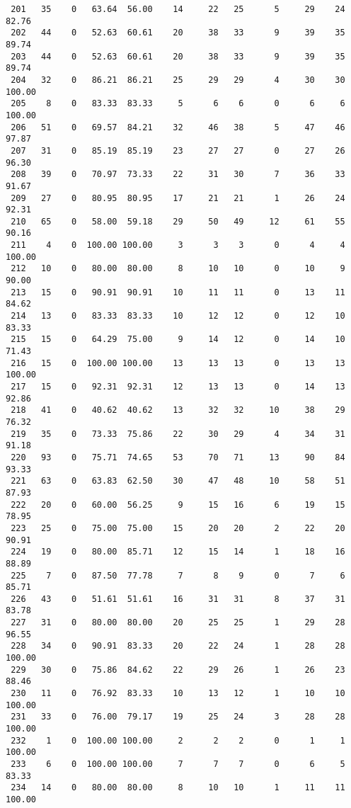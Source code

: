 \begin{verbatim}
 201   35    0   63.64  56.00    14     22   25      5     29    24    82.76
 202   44    0   52.63  60.61    20     38   33      9     39    35    89.74
 203   44    0   52.63  60.61    20     38   33      9     39    35    89.74
 204   32    0   86.21  86.21    25     29   29      4     30    30   100.00
 205    8    0   83.33  83.33     5      6    6      0      6     6   100.00
 206   51    0   69.57  84.21    32     46   38      5     47    46    97.87
 207   31    0   85.19  85.19    23     27   27      0     27    26    96.30
 208   39    0   70.97  73.33    22     31   30      7     36    33    91.67
 209   27    0   80.95  80.95    17     21   21      1     26    24    92.31
 210   65    0   58.00  59.18    29     50   49     12     61    55    90.16
 211    4    0  100.00 100.00     3      3    3      0      4     4   100.00
 212   10    0   80.00  80.00     8     10   10      0     10     9    90.00
 213   15    0   90.91  90.91    10     11   11      0     13    11    84.62
 214   13    0   83.33  83.33    10     12   12      0     12    10    83.33
 215   15    0   64.29  75.00     9     14   12      0     14    10    71.43
 216   15    0  100.00 100.00    13     13   13      0     13    13   100.00
 217   15    0   92.31  92.31    12     13   13      0     14    13    92.86
 218   41    0   40.62  40.62    13     32   32     10     38    29    76.32
 219   35    0   73.33  75.86    22     30   29      4     34    31    91.18
 220   93    0   75.71  74.65    53     70   71     13     90    84    93.33
 221   63    0   63.83  62.50    30     47   48     10     58    51    87.93
 222   20    0   60.00  56.25     9     15   16      6     19    15    78.95
 223   25    0   75.00  75.00    15     20   20      2     22    20    90.91
 224   19    0   80.00  85.71    12     15   14      1     18    16    88.89
 225    7    0   87.50  77.78     7      8    9      0      7     6    85.71
 226   43    0   51.61  51.61    16     31   31      8     37    31    83.78
 227   31    0   80.00  80.00    20     25   25      1     29    28    96.55
 228   34    0   90.91  83.33    20     22   24      1     28    28   100.00
 229   30    0   75.86  84.62    22     29   26      1     26    23    88.46
 230   11    0   76.92  83.33    10     13   12      1     10    10   100.00
 231   33    0   76.00  79.17    19     25   24      3     28    28   100.00
 232    1    0  100.00 100.00     2      2    2      0      1     1   100.00
 233    6    0  100.00 100.00     7      7    7      0      6     5    83.33
 234   14    0   80.00  80.00     8     10   10      1     11    11   100.00

\end{verbatim}
